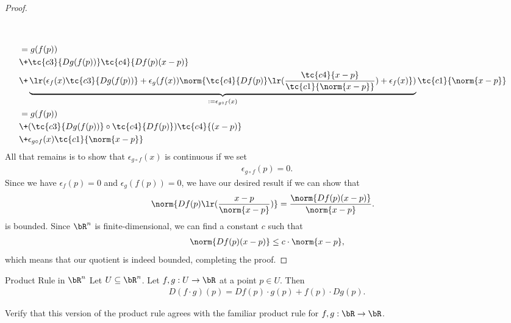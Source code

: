 \begin{proof}
\begin{align*}
{		}
		\\
	\\
		&=
		g(f(p))\\ 
		&\+ 
		\tc{c3}{Dg(f(p))}\tc{c4}{Df(p)(x-p)}\\
		&\+ 
		\underbrace{
			\lr(\epsilon_f(x)\tc{c3}{Dg(f(p))}
			+ 
			\epsilon_g(f(x))
			\norm{\tc{c4}{Df(p)} \lr(\frac{\tc{c4}{x-p}}{\tc{c1}{\norm{x-p}}}) + \epsilon_f(x)})
		}
		_
		{:= \epsilon_{g \circ f}(x)}
		\tc{c1}{\norm{x - p}}
	\\
		&=
		g(f(p))\\ 
		&\+ (\tc{c3}{Dg(f(p))} \circ \tc{c4}{Df(p)})\tc{c4}{(x-p)}\\
		&\+ \epsilon_{g \circ f}(x)\tc{c1}{\norm{x - p}} 
	\end{align*}
	All that remains is to show that $\epsilon_{g \circ f}(x)$ is continuous if we set
	\begin{align*}
		\epsilon_{g \circ f}(p) = 0.
	\end{align*}
	Since we have $\epsilon_f(p) = 0$ and $\epsilon_g(f(p)) = 0$, we have our desired result if we can show that 
	\begin{align*}
		\norm{Df(p) \lr(\frac{x - p}{\norm{x-p}})}
		&=
		\frac{\norm{Df(p)(x-p)}}{\norm{x-p}}.
	\end{align*}
	is bounded.
	Since $\bR^n$ is finite-dimensional, we can find a constant $c$ such that
	\begin{align*}
		\norm{Df(p)(x-p)} \leq c \cdot \norm{x-p},
	\end{align*}
	which means that our quotient is indeed bounded, completing the proof.
\end{proof}
\begin{importanttheorem}{Product Rule in $\bR^n$}{}
	Let $U \subseteq \bR^n$. Let $f,g : U \to \bR$ at a point $p \in U$. Then
	\begin{align*}
		D(f \cdot g)(p) = Df(p) \cdot g(p) + f(p) \cdot Dg(p).
	\end{align*}
\end{importanttheorem}
\begin{exercise}
	Verify that this version of the product rule agrees with the familiar product rule for $f,g : \bR \to \bR$.
\end{exercise}
